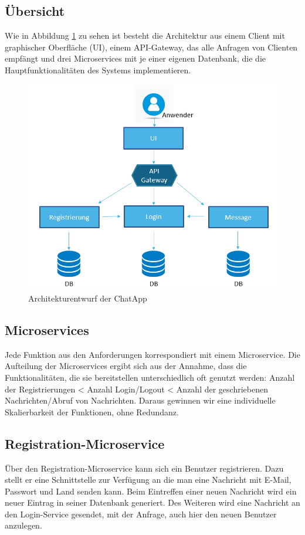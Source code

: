 \subsection{Übersicht}
Wie in Abbildung \ref{entwurf} zu sehen ist besteht die Architektur aus einem Client mit graphischer Oberfläche (UI), einem API-Gateway, das alle Anfragen von Clienten empfängt und drei Microservices mit je einer eigenen Datenbank, die die Hauptfunktionalitäten des Systems implementieren.\newpage
\begin{figure}[bth] 
	\centering
	\includegraphics[width=1.0\textwidth]{Graphics/Architekturentwurf.png}
	\caption{Architekturentwurf der ChatApp}
	\label{entwurf}
\end{figure}
\subsection{Microservices}
Jede Funktion aus den Anforderungen korrespondiert mit einem Microservice. Die Aufteilung der Microservices ergibt sich aus der Annahme, dass die Funktionalitäten, die sie bereitstellen unterschiedlich oft genutzt werden: Anzahl der Registrierungen < Anzahl Login/Logout < Anzahl der geschriebenen Nachrichten/Abruf von Nachrichten. Daraus gewinnen wir eine individuelle Skalierbarkeit der Funktionen, ohne Redundanz.

\subsection{Registration-Microservice}
Über den Registration-Microservice kann sich ein Benutzer registrieren. Dazu stellt er eine Schnittstelle zur Verfügung an die man eine Nachricht mit E-Mail, Passwort und Land senden kann. Beim Eintreffen einer neuen Nachricht wird ein neuer Eintrag in seiner Datenbank generiert. Des Weiteren wird eine Nachricht an den Login-Service gesendet, mit der Anfrage, auch hier den neuen Benutzer anzulegen.

